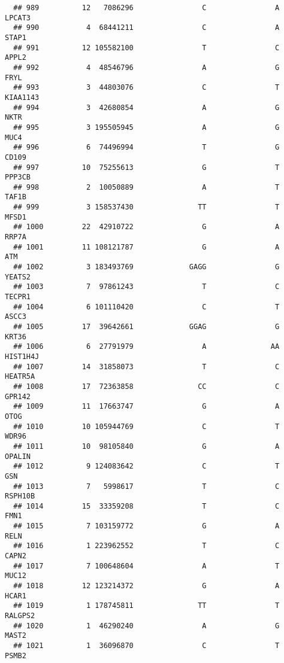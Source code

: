 \documentclass[12pt,twoside]{reedthesis}
\theoremstyle{definition}
\theoremstyle{definition}
\theoremstyle{remark}
\begin{document}
\begin{verbatim}
  ## 989          12   7086296                C                A         LPCAT3
  ## 990           4  68441211                C                A          STAP1
  ## 991          12 105582100                T                C          APPL2
  ## 992           4  48546796                A                G           FRYL
  ## 993           3  44803076                C                T       KIAA1143
  ## 994           3  42680854                A                G           NKTR
  ## 995           3 195505945                A                G           MUC4
  ## 996           6  74496994                T                G          CD109
  ## 997          10  75255613                G                T         PPP3CB
  ## 998           2  10050889                A                T          TAF1B
  ## 999           3 158537430               TT                T          MFSD1
  ## 1000         22  42910722                G                A          RRP7A
  ## 1001         11 108121787                G                A            ATM
  ## 1002          3 183493769             GAGG                G         YEATS2
  ## 1003          7  97861243                T                C         TECPR1
  ## 1004          6 101110420                C                T          ASCC3
  ## 1005         17  39642661             GGAG                G          KRT36
  ## 1006          6  27791979                A               AA       HIST1H4J
  ## 1007         14  31858073                T                C        HEATR5A
  ## 1008         17  72363858               CC                C         GPR142
  ## 1009         11  17663747                G                A           OTOG
  ## 1010         10 105944769                C                T          WDR96
  ## 1011         10  98105840                G                A         OPALIN
  ## 1012          9 124083642                C                T            GSN
  ## 1013          7   5998617                T                C        RSPH10B
  ## 1014         15  33359208                T                C           FMN1
  ## 1015          7 103159772                G                A           RELN
  ## 1016          1 223962552                T                C          CAPN2
  ## 1017          7 100648604                A                T          MUC12
  ## 1018         12 123214372                G                A          HCAR1
  ## 1019          1 178745811               TT                T        RALGPS2
  ## 1020          1  46290240                A                G          MAST2
  ## 1021          1  36096870                C                T          PSMB2

\end{verbatim}
\end{document}
